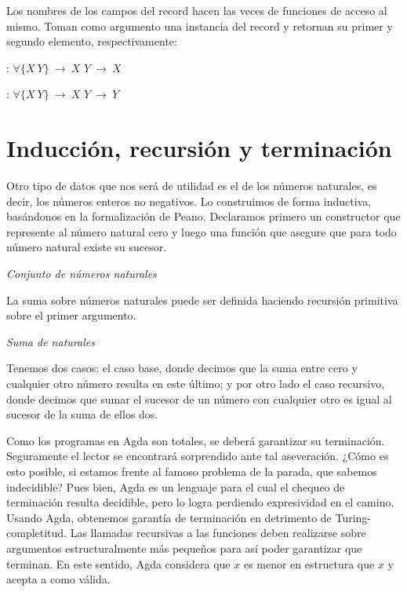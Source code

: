Los nombres de los campos del record hacen las veces de funciones de acceso al mismo. Toman como argumento una instancia del record y retornan su primer y segundo elemento, respectivamente:

\sangrar
{} : $\forall\{X\ Y\}\ \to\ X$ \AgdaFunction{$\times$} $Y\ \to\ X$

\sangrar
{} : $\forall\{X\ Y\}\ \to\ X$ \AgdaFunction{$\times$} $Y\ \to\ Y$


\section{Inducción, recursión y terminación}

Otro tipo de datos que nos será de utilidad es el de los números naturales, es decir, los números enteros no negativos. Lo construimos de forma inductiva, basándonos en la formalización de Peano.
Declaramos primero un constructor  que represente al número natural cero y luego una función  que asegure que para todo número natural existe su sucesor.

\begin{agdacode}{\it Conjunto de números naturales} \label{code:nat}

\end{agdacode}

La suma sobre números naturales puede ser definida haciendo recursión primitiva sobre el primer argumento.

\begin{agdacode}{\it Suma de naturales} \label{code:suma}

\end{agdacode}

Tenemos dos casos: el caso base, donde decimos que la suma entre cero y cualquier otro número resulta en este último; y por otro lado el caso recursivo, donde decimos que sumar el sucesor de un número con cualquier otro es igual al sucesor de la suma de ellos dos.

Como los programas en Agda son totales, se deberá garantizar su terminación. Seguramente el lector se encontrará sorprendido ante tal aseveración. ¿Cómo es esto posible, si estamos frente al famoso problema de la parada, que sabemos indecidible? Pues bien, Agda es un lenguaje para el cual el chequeo de terminación resulta decidible, pero lo logra perdiendo expresividad en el camino. Usando Agda, obtenemos garantía de terminación en detrimento de Turing-completitud. 
Las llamadas recursivas a las funciones deben realizarse sobre argumentos estructuralmente más pequeños para así poder garantizar que terminan. En este sentido, Agda considera que $x$ es menor en estructura que  $x$ y acepta a  como válida.

